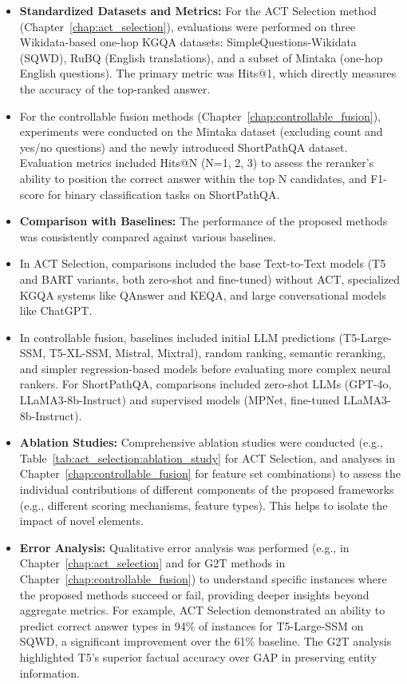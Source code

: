 \begin{itemize}
    \item \textbf{Standardized Datasets and Metrics:} For the ACT Selection method (Chapter~\ref{chap:act_selection}), evaluations were performed on three Wikidata-based one-hop KGQA datasets: SimpleQuestions-Wikidata (SQWD), RuBQ (English translations), and a subset of Mintaka (one-hop English questions). The primary metric was Hits@1, which directly measures the accuracy of the top-ranked answer.
    \item For the controllable fusion methods (Chapter~\ref{chap:controllable_fusion}), experiments were conducted on the Mintaka dataset (excluding count and yes/no questions) and the newly introduced ShortPathQA dataset. Evaluation metrics included Hits@N (N=1, 2, 3) to assess the reranker's ability to position the correct answer within the top N candidates, and F1-score for binary classification tasks on ShortPathQA.
    \item \textbf{Comparison with Baselines:} The performance of the proposed methods was consistently compared against various baselines.
        \item In ACT Selection, comparisons included the base Text-to-Text models (T5 and BART variants, both zero-shot and fine-tuned) without ACT, specialized KGQA systems like QAnswer and KEQA, and large conversational models like ChatGPT.
        \item In controllable fusion, baselines included initial LLM predictions (T5-Large-SSM, T5-XL-SSM, Mistral, Mixtral), random ranking, semantic reranking, and simpler regression-based models before evaluating more complex neural rankers. For ShortPathQA, comparisons included zero-shot LLMs (GPT-4o, LLaMA3-8b-Instruct) and supervised models (MPNet, fine-tuned LLaMA3-8b-Instruct).
    \item \textbf{Ablation Studies:} Comprehensive ablation studies were conducted (e.g., Table~\ref{tab:act_selection:ablation_study} for ACT Selection, and analyses in Chapter~\ref{chap:controllable_fusion} for feature set combinations) to assess the individual contributions of different components of the proposed frameworks (e.g., different scoring mechanisms, feature types). This helps to isolate the impact of novel elements.
    \item \textbf{Error Analysis:} Qualitative error analysis was performed (e.g., in Chapter~\ref{chap:act_selection} and for G2T methods in Chapter~\ref{chap:controllable_fusion}) to understand specific instances where the proposed methods succeed or fail, providing deeper insights beyond aggregate metrics. For example, ACT Selection demonstrated an ability to predict correct answer types in 94\% of instances for T5-Large-SSM on SQWD, a significant improvement over the 61\% baseline. The G2T analysis highlighted T5's superior factual accuracy over GAP in preserving entity information.

\end{itemize}
